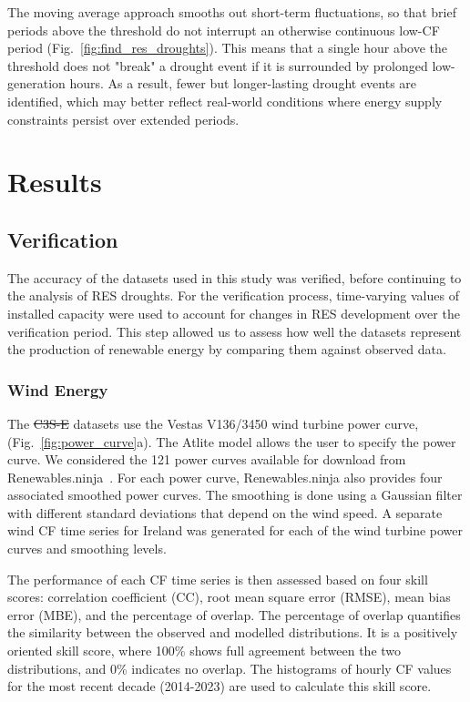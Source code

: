 \documentclass[preprint, 12pt]{elsarticle}
\providecommand{\DIFadd}[1]{{\protect\color{blue}\uwave{#1}}} %
\providecommand{\DIFdel}[1]{{\protect\color{red}\sout{#1}}}                      %
\providecommand{\DIFaddbegin}{} %
\providecommand{\DIFaddend}{} %
\providecommand{\DIFdelbegin}{} %
\providecommand{\DIFdelend}{} %
\begin{document}
The moving average approach smooths out short-term fluctuations, so that brief periods above the threshold do not interrupt an otherwise continuous low-CF period (Fig.~\ref{fig:find_res_droughts}). This means that a single hour above the threshold does not "break" a drought event if it is surrounded by prolonged low-generation hours. As a result, fewer but longer-lasting drought events are identified, which may better reflect real-world conditions where energy supply constraints persist over extended periods.

\section{Results}
\DIFdelbegin %
\DIFdelend \DIFaddbegin \label{sec:results}
\DIFaddend 

\subsection{Verification}
\label{sec:verification}

The accuracy of the datasets used in this study was verified, before continuing to the analysis of RES droughts. For the verification process, time-varying values of installed capacity were used to account for changes in RES development over the verification period. This step allowed us to assess how well the datasets represent the production of renewable energy by comparing them against observed data.

\subsubsection{Wind Energy}
\label{sec:wind_verification}

The \DIFdelbegin \DIFdel{C3S-E }\DIFdelend \DIFaddbegin \DIFadd{C3S }\DIFaddend datasets use the Vestas V136/3450 wind turbine power curve, (Fig.~\ref{fig:power_curve}a). The Atlite model allows the user to specify the power curve. We considered the 121 power curves available for download from Renewables.ninja~\citep{staffell2016wake}. For each power curve, Renewables.ninja also provides four associated smoothed power curves. The smoothing is done using a Gaussian filter with different standard deviations that depend on the wind speed. A separate wind CF time series for Ireland was generated for each of the wind turbine power curves and smoothing levels.

The performance of each CF time series is then assessed based on four skill scores: correlation coefficient (CC), root mean square error (RMSE), mean bias error (MBE), and the percentage of overlap. The percentage of overlap quantifies the similarity between the observed and modelled distributions. It is a positively oriented skill score, where 100\% shows full agreement between the two distributions, and 0\% indicates no overlap. The histograms of hourly CF values for the most recent decade (2014-2023) are used to calculate this skill score.
\end{document}
